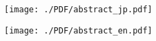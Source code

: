 \documentclass[uplatex,dvipdfmx]{ujarticle}
\begin{document}
%
%

\begin{figure}[ht]
\centerline{
	\texttt{[image: ./PDF/abstract\_jp.pdf]}
}
\end{figure}

\begin{figure}[ht]
\centerline{
	\texttt{[image: ./PDF/abstract\_en.pdf]}
}
\end{figure}


\afterpage{\clearpage}
\newpage


\tableofcontents

\afterpage{\clearpage}
\newpage

\end{document}
